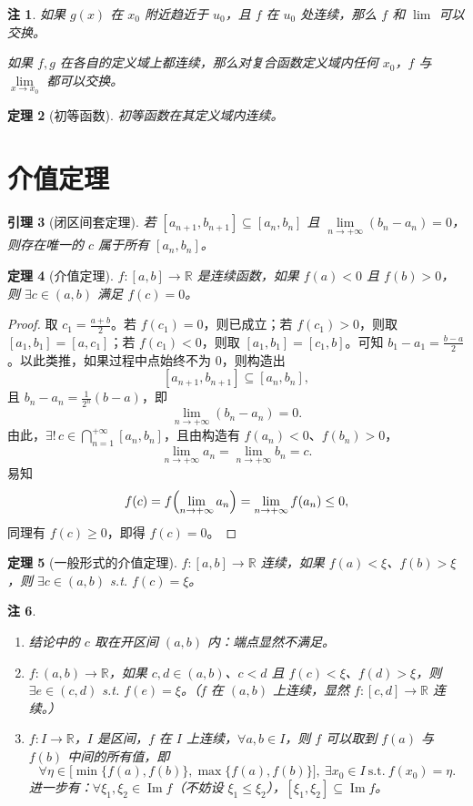 \documentclass[UTF8,11pt]{ctexart}
\theoremstyle{cnthm}
\newtheorem{thm}{定理}[section]
\newtheorem{lem}[thm]{引理}
\newtheorem{rem}[thm]{注}
\begin{document}
\begin{rem}
如果 $g(x)$ 在 $x_0$ 附近趋近于 $u_0$，且 $f$ 在 $u_0$ 处连续，那么 $f$ 和 $\lim$ 可以交换。

如果 $f,g$ 在各自的定义域上都连续，那么对复合函数定义域内任何 $x_0$，$f$ 与 $\lim\limits_{x\to x_0}$ 都可以交换。
\end{rem}

\begin{thm}[初等函数]
初等函数在其定义域内连续。
\end{thm}

\section{介值定理}

\begin{lem}[闭区间套定理]
若 $[a_{n+1},b_{n+1}]\subseteq[a_n,b_n]$ 且 $\lim\limits_{n\to+\infty}(b_n-a_n)=0$，则存在唯一的 $c$ 属于所有 $[a_n,b_n]$。
\end{lem}

\begin{thm}[介值定理]
$f:[a,b]\to\mathbb{R}$ 是连续函数，如果 $f(a)<0$ 且 $f(b)>0$，则 $\exists c\in(a,b)$ 满足 $f(c)=0$。
\end{thm}

\begin{proof}
取 $c_1=\frac{a+b}{2}$。若 $f(c_1)=0$，则已成立；若 $f(c_1)>0$，则取 $[a_1,b_1]=[a,c_1]$；若 $f(c_1)<0$，则取 $[a_1,b_1]=[c_1,b]$。可知 $b_1-a_1=\frac{b-a}{2}$。以此类推，如果过程中点始终不为 $0$，则构造出
\[
[a_{n+1},b_{n+1}]\subseteq[a_n,b_n],
\]
且 $b_n-a_n=\frac{1}{2^n}(b-a)$，即
\[
\lim_{n\to+\infty}(b_n-a_n)=0.
\]
由此，$\exists!\,c\in\bigcap\limits_{n=1}^{+\infty}[a_n,b_n]$，且由构造有 $f(a_n)<0$、$f(b_n)>0$，
\[
\lim_{n\to+\infty}a_n=\lim_{n\to+\infty}b_n=c.
\]
易知
\[
f(c)=f\Bigl(\lim_{n\to+\infty}a_n\Bigr)=\lim_{n\to+\infty}f(a_n)\le 0,
\]
同理有 $f(c)\ge 0$，即得 $f(c)=0$。
\end{proof}

\begin{thm}[一般形式的介值定理]
$f:[a,b]\to\mathbb{R}$ 连续，如果 $f(a)<\xi$、$f(b)>\xi$，则 $\exists c\in(a,b)$ s.t. $f(c)=\xi$。
\end{thm}

\begin{rem}
\begin{enumerate}
\item 结论中的 $c$ 取在开区间 $(a,b)$ 内：端点显然不满足。
\item $f:(a,b)\to\mathbb{R}$，如果 $c,d\in(a,b)$、$c<d$ 且 $f(c)<\xi$、$f(d)>\xi$，则 $\exists e\in(c,d)$ s.t. $f(e)=\xi$。（$f$ 在 $(a,b)$ 上连续，显然 $f:[c,d]\to\mathbb{R}$ 连续。）
\item $f:I\to\mathbb{R}$，$I$ 是区间，$f$ 在 $I$ 上连续，$\forall a,b\in I$，则 $f$ 可以取到 $f(a)$ 与 $f(b)$ 中间的所有值，即
\[
\forall\eta\in\bigl[\min\{f(a),f(b)\},\max\{f(a),f(b)\}\bigr],\ \exists x_0\in I\ \text{s.t.}\ f(x_0)=\eta.
\]
进一步有：$\forall\xi_1,\xi_2\in\operatorname{Im}f$（不妨设 $\xi_1\le\xi_2$），$[\xi_1,\xi_2]\subseteq\operatorname{Im}f$。
\end{enumerate}
\end{rem}
\end{document}
